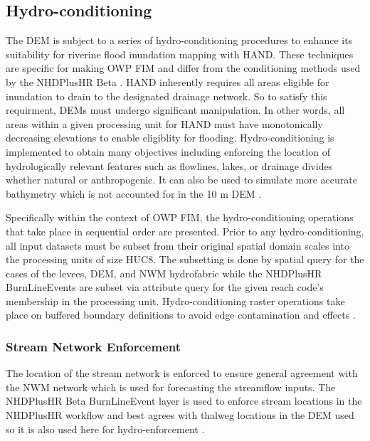 \documentclass[draft]{dependencies/agujournal2019}
\begin{document}
\subsection{Hydro-conditioning}
\label{ssec:hydro_conditioning}
%
The DEM is subject to a series of hydro-conditioning procedures to enhance its suitability for riverine flood inundation mapping with HAND. 
These techniques are specific for making OWP FIM and differ from the conditioning methods used by the NHDPlusHR Beta \cite{moore2019user}.
HAND inherently requires all areas eligible for inundation to drain to the designated drainage network.
So to satisfy this requirment, DEMs must undergo significant manipulation.
In other words, all areas within a given processing unit for HAND must have monotonically decreasing elevations to enable eligiblity for flooding.
Hydro-conditioning is implemented to obtain many objectives including enforcing the location of hydrologically relevant features such as flowlines, lakes, or drainage divides whether natural or anthropogenic. 
It can also be used to simulate more accurate bathymetry which is not accounted for in the 10 m DEM \cite{gesch2002national}.

Specifically within the context of OWP FIM, the hydro-conditioning operations that take place in sequential order are presented. 
Prior to any hydro-conditioning, all input datasets must be subset from their original spatial domain scales into the processing units of size HUC8. 
The subsetting is done by spatial query for the cases of the levees, DEM, and NWM hydrofabric while the NHDPlusHR BurnLineEvents are subset via attribute query for the given reach code's membership in the processing unit.
Hydro-conditioning raster operations take place on buffered boundary definitions to avoid edge contamination and effects \cite{lindsay2013measuring}. 
%
\subsubsection{Stream Network Enforcement} 
\label{ssec:stream_network_enforcment}
%
The location of the stream network is enforced to ensure general agreement with the NWM network which is used for forecasting the streamflow inputs.
The NHDPlusHR Beta BurnLineEvent layer is used to enforce stream locations in the NHDPlusHR workflow and best agrees with thalweg locations in the DEM used so it is also used here for hydro-enforcement \cite{moore2019user}. 
\end{document}

